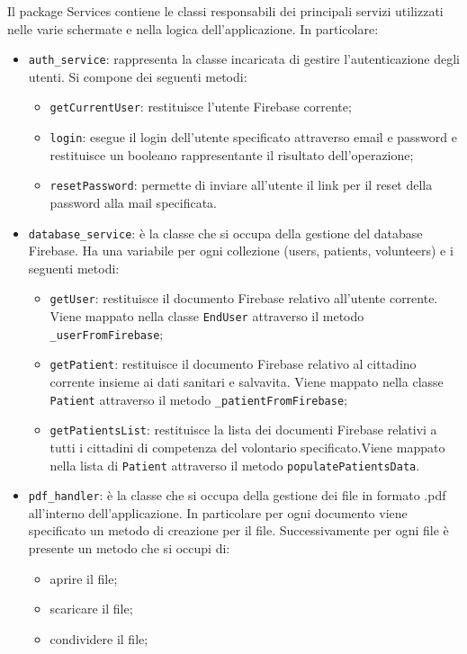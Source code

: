 \documentclass[12pt,a4paper,twoside,openright,titlepage]{book}
\begin{document}
Il package Services contiene le classi responsabili dei principali servizi utilizzati nelle varie schermate e nella logica dell'applicazione. In particolare:
\begin{itemize}
\item \texttt{auth\_service}: rappresenta la classe incaricata di gestire l'autenticazione degli utenti. Si compone dei seguenti metodi:
\begin{itemize}
\item \texttt{getCurrentUser}: restituisce l'utente Firebase corrente;
\item \texttt{login}: esegue il login dell'utente specificato attraverso email e password e restituisce un booleano rappresentante il risultato dell'operazione;
\item \texttt{resetPassword}: permette di inviare all'utente il link per il reset della password alla mail specificata.
\end{itemize}
\item \texttt{database\_service}: è la classe che si occupa della gestione del database Firebase. Ha una variabile per ogni collezione (users, patients, volunteers) e i seguenti metodi:
\begin{itemize}
\item \texttt{getUser}: restituisce il documento Firebase relativo all'utente corrente. Viene mappato nella classe \texttt{EndUser} attraverso il metodo \texttt{\_userFromFirebase};
\item \texttt{getPatient}: restituisce il documento Firebase relativo al cittadino corrente insieme ai dati sanitari e salvavita. Viene mappato nella classe \texttt{Patient} attraverso il metodo \texttt{\_patientFromFirebase};
\item \texttt{getPatientsList}: restituisce la lista dei documenti Firebase relativi a tutti i cittadini di competenza del volontario specificato.Viene mappato nella lista di \texttt{Patient} attraverso il metodo \texttt{populatePatientsData}.
\end{itemize}
\item \texttt{pdf\_handler}: è la classe che si occupa della gestione dei file in formato .pdf all'interno dell'applicazione. In particolare per ogni documento viene specificato un metodo di creazione per il file. Successivamente per ogni file è presente un metodo che si occupi di:
\begin{itemize}
\item aprire il file;
\item scaricare il file;
\item condividere il file;

\end{itemize}
\end{itemize}
\end{document}
